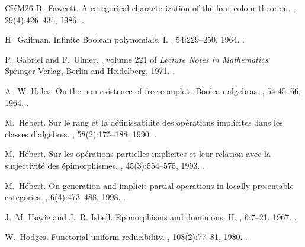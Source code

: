 \documentclass[a4paper,10pt,reqno]{amsart}
\theoremstyle{definition}
\theoremstyle{remark}
\begin{document}
\begin{thebibliography}{CKM26}
B.~Fawcett.
\newblock A categorical characterization of the four colour theorem.
, 29(4):426--431, 1986.
\newblock \href {https://doi.org/10.4153/CMB-1986-067-8}
  {}.

H.~Gaifman.
\newblock Infinite {B}oolean polynomials. {I}.
, 54:229--250, 1964.
\newblock \href {https://doi.org/10.4064/fm-54-3-229-250}
  {}.

P.~Gabriel and F.~Ulmer.
, volume 221 of {\em Lecture
  Notes in Mathematics}.
\newblock Springer-Verlag, Berlin and Heidelberg, 1971.
\newblock \href {https://doi.org/10.1007/BFb0059396}
  {}.

A.~W. Hales.
\newblock On the non-existence of free complete {B}oolean algebras.
, 54:45--66, 1964.
\newblock \href {https://doi.org/10.4064/fm-54-1-45-66}
  {}.

M.~H{\'e}bert.
\newblock Sur le rang et la d\'efinissabilit\'e{} des op\'erations implicites
  dans les classes d'alg\`ebres.
, 58(2):175--188, 1990.
\newblock \href {https://doi.org/10.4064/cm-58-2-175-188}
  {}.

M.~H{\'e}bert.
\newblock Sur les op\'erations partielles implicites et leur relation avec la
  surjectivit\'e{} des \'epimorphismes.
, 45(3):554--575, 1993.
\newblock \href {https://doi.org/10.4153/CJM-1993-029-3}
  {}.

M.~H{\'e}bert.
\newblock On generation and implicit partial operations in locally presentable
  categories.
, 6(4):473--488, 1998.
\newblock \href {https://doi.org/10.1023/A:1008653513618}
  {}.

J.~M. Howie and J.~R. Isbell.
\newblock Epimorphisms and dominions. {II}.
, 6:7--21, 1967.
\newblock \href {https://doi.org/10.1016/0021-8693(67)90010-5}
  {}.

W.~Hodges.
\newblock Functorial uniform reducibility.
, 108(2):77--81, 1980.
\newblock \href {https://doi.org/10.4064/fm-108-2-77-81}
  {}.


\end{thebibliography}
\end{document}
